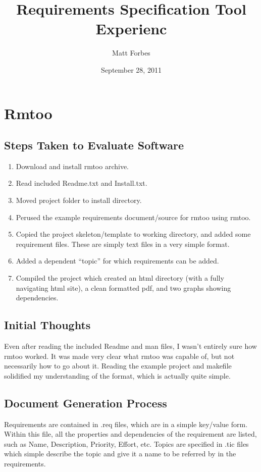 \documentclass[12pt]{article}
\title{Requirements Specification Tool Experienc}
\author{Matt Forbes}
\date{September 28, 2011}
\begin{document}
\maketitle						

\setcounter{tocdepth}{2}
\tableofcontents 
\newpage 
{}

\section{Rmtoo}

\subsection{Steps Taken to Evaluate Software}
\begin{enumerate}
\item Download and install rmtoo archive.
\item Read included Readme.txt and Install.txt.
\item Moved project folder to install directory.
\item Perused the example requirements document/source for rmtoo using
  rmtoo.
\item Copied the project skeleton/template to working directory, and
  added some requirement files. These are simply text files in a very
  simple format.
\item Added a dependent ``topic'' for which requirements can be added.
\item Compiled the project which created an html directory (with a
  fully navigating html site), a clean formatted pdf, and two graphs
  showing dependencies.
\end{enumerate}

\subsection{Initial Thoughts}
Even after reading the included Readme and man files, I wasn't
entirely sure how rmtoo worked. It was made very clear what rmtoo was
capable of, but not necessarily how to go about it. Reading the
example project and makefile solidified my understanding of the
format, which is actually quite simple.

\subsection{Document Generation Process}
Requirements are contained in .req files, which are in a simple
key/value form. Within this file, all the properties and dependencies
of the requirement are listed, such as Name, Description, Priority,
Effort, etc. Topics are specified in .tic files which simple describe
the topic and give it a name to be referred by in the requirements.
\end{document}
